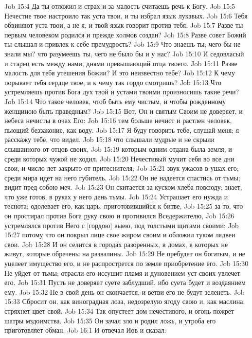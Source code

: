 Job 15:4  Да ты отложил и страх и за малость считаешь речь к Богу.
Job 15:5  Нечестие твое настроило так уста твои, и ты избрал язык лукавых.
Job 15:6  Тебя обвиняют уста твои, а не я, и твой язык говорит против тебя.
Job 15:7  Разве ты первым человеком родился и прежде холмов создан?
Job 15:8  Разве совет Божий ты слышал и привлек к себе премудрость?
Job 15:9  Что знаешь ты, чего бы не знали мы? что разумеешь ты, чего не было бы и у нас?
Job 15:10  И седовласый и старец есть между нами, днями превышающий отца твоего.
Job 15:11  Разве малость для тебя утешения Божии? И это неизвестно тебе?
Job 15:12  К чему порывает тебя сердце твое, и к чему так гордо смотришь?
Job 15:13  Что устремляешь против Бога дух твой и устами твоими произносишь такие речи?
Job 15:14  Что такое человек, чтоб быть ему чистым, и чтобы рожденному женщиною быть праведным?
Job 15:15  Вот, Он и святым Своим не доверяет, и небеса нечисты в очах Его:
Job 15:16  тем больше нечист и растлен человек, пьющий беззаконие, как воду.
Job 15:17  Я буду говорить тебе, слушай меня; я расскажу тебе, что видел,
Job 15:18  что слышали мудрые и не скрыли слышанного от отцов своих,
Job 15:19  которым одним отдана была земля, и среди которых чужой не ходил.
Job 15:20  Нечестивый мучит себя во все дни свои, и число лет закрыто от притеснителя;
Job 15:21  звук ужасов в ушах его; среди мира идет на него губитель.
Job 15:22  Он не надеется спастись от тьмы; видит пред собою меч.
Job 15:23  Он скитается за куском хлеба повсюду; знает, что уже готов, в руках у него день тьмы.
Job 15:24  Устрашает его нужда и теснота; одолевает его, как царь, приготовившийся к битве,
Job 15:25  за то, что он простирал против Бога руку свою и противился Вседержителю,
Job 15:26  устремлялся против Него с [гордою] выею, под толстыми щитами своими;
Job 15:27  потому что он покрыл лице свое жиром своим и обложил туком лядвеи свои.
Job 15:28  И он селится в городах разоренных, в домах, в которых не живут, которые обречены на развалины.
Job 15:29  Не пребудет он богатым, и не уцелеет имущество его, и не распрострется по земле приобретение его.
Job 15:30  Не уйдет от тьмы; отрасли его иссушит пламя и дуновением уст своих увлечет его.
Job 15:31  Пусть не доверяет суете заблудший, ибо суета будет и воздаянием ему.
Job 15:32  Не в свой день он скончается, и ветви его не будут зеленеть.
Job 15:33  Сбросит он, как виноградная лоза, недозрелую ягоду свою и, как маслина, стряхнет цвет свой.
Job 15:34  Так опустеет дом нечестивого, и огонь пожрет шатры мздоимства.
Job 15:35  Он зачал зло и родил ложь, и утроба его приготовляет обман.
Job 16:1  И отвечал Иов и сказал:
